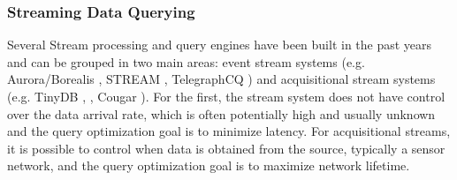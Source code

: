 
\subsubsection{Streaming Data Querying}
\label{sec:str_data_query} 


Several Stream processing and query engines have been built in the past years and can be grouped in two main areas: event stream systems (e.g. Aurora/Borealis \cite{Abadi_2005}, STREAM \cite{Arasu_06a}, TelegraphCQ \cite{Chandrasekaran_03}) and acquisitional stream systems (e.g. TinyDB \cite{Madden_05}, \snee \cite{Galpin_09}, Cougar \cite{Yao_02}). For the first, the stream system does not have control over the data arrival rate, which is often potentially high and usually unknown and the query optimization goal is to minimize latency. 
For acquisitional streams, it is possible to control when data is obtained from the source, typically a sensor network, and the query optimization goal is to maximize network lifetime. 

